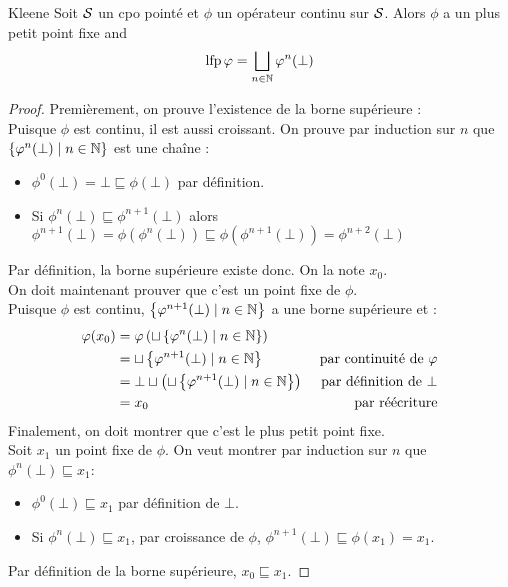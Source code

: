 \documentclass{cours}
\begin{document}
\begin{théorème}{Kleene}{}
    Soit $\mathcal{S}$ un cpo pointé et $\phi$ un opérateur continu sur $\mathcal{S}$. Alors $\phi$ a un plus petit point fixe and 
    \[
        \operatorname{lfp} \varphi = \bigsqcup_{n \in \mathbb{N}} \varphi^{n}(\bot)
    \]
\end{théorème}
\begin{proof}
    Premièrement, on prouve l'existence de la borne supérieure :\\
    Puisque $\phi$ est continu, il est aussi croissant. On prouve par induction sur $n$ que $\left\{\varphi^{n}(\bot) \mid n \in \mathbb{N}\right\}$ est une chaîne : 
    \begin{itemize}
        \item $\phi^{0}(\bot) = \bot \sqsubseteq \phi(\bot)$ par définition.
        \item Si $\phi^{n}(\bot) \sqsubseteq \phi^{n + 1}(\bot)$ alors $\phi^{n + 1}(\bot) = \phi\left(\phi^{n}(\bot)\right)\sqsubseteq\phi\left(\phi^{n + 1}(\bot)\right) = \phi^{n + 2}(\bot)$
    \end{itemize}
    Par définition, la borne supérieure existe donc. On la note $x_{0}$.\\

    On doit maintenant prouver que c'est un point fixe de $\phi$.\\
    Puisque $\phi$ est continu, $\left\{\varphi^{n + 1}(\bot) \mid n \in \mathbb{N}\right\}$ a une borne supérieure et : 
    \[
        \begin{aligned}
            \varphi(x_{0}) &= \varphi\left(\sqcup\left\{\varphi^{n}(\bot) \mid n \in \mathbb{N}\right\}\right)& \\
            &= \sqcup\left\{\varphi^{n + 1}(\bot)\mid n\in \mathbb{N}\right\} & \text{ par continuité de } \varphi\\
            &=\bot \sqcup \left(\sqcup\left\{\varphi^{n + 1}(\bot)\mid n\in \mathbb{N}\right\}\right) & \text{ par définition de } \bot\\
            &=x_{0} &\text{ par réécriture}
        \end{aligned}
    \]
    Finalement, on doit montrer que c'est le plus petit point fixe.\\
    Soit $x_{1}$ un point fixe de $\phi$. On veut montrer par induction sur $n$ que $\phi^{n}(\bot) \sqsubseteq x_{1}$:
    \begin{itemize}
        \item $\phi^{0}(\bot) \sqsubseteq x_{1}$ par définition de $\bot$.
        \item Si $\phi^{n}(\bot) \sqsubseteq x_{1}$, par croissance de $\phi$, $\phi^{n + 1}(\bot) \sqsubseteq \phi(x_{1}) = x_{1}$. 
    \end{itemize}
    Par définition de la borne supérieure, $x_{0} \sqsubseteq x_{1}$.
\end{proof}
\end{document}
